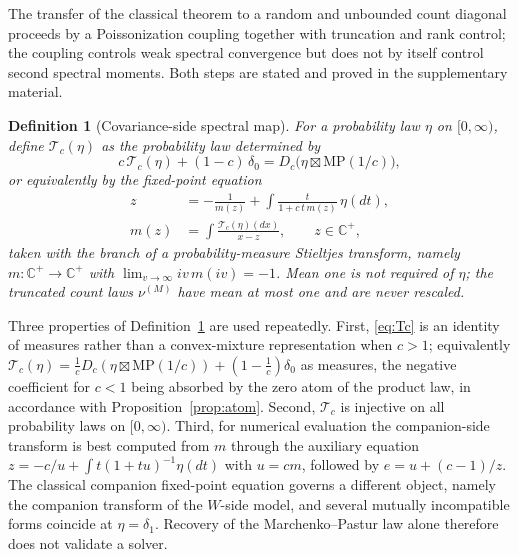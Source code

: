 \documentclass[lettersize,journal]{IEEEtran}
\newtheorem{defi}[theo]{Definition}
\theoremstyle{remark}
\begin{document}
The transfer of the classical theorem to a random and unbounded count diagonal
proceeds by a Poissonization coupling together with truncation and rank
control; the coupling controls weak spectral convergence but does not by itself
control second spectral moments. Both steps are stated and proved in the
supplementary material.

\begin{defi}[Covariance-side spectral map\cite{silverstein1995analysis}]
\label{def:Tc}
For a probability law $\eta$ on $[0,\infty)$, define $\mathcal{T}_c(\eta)$ as
the probability law determined by
\begin{equation}
  c\,\mathcal{T}_c(\eta)+(1-c)\,\delta_0
    = D_c\big(\eta\boxtimes\mathrm{MP}(1/c)\big),
  \label{eq:Tc}
\end{equation}
or equivalently by the fixed-point equation
\begin{align}
  z&=-\tfrac1{m(z)}+\int\tfrac{t}{1+c\,t\,m(z)}\,\eta(dt),\nonumber\\
  m(z)&=\int\tfrac{\mathcal{T}_c(\eta)(dx)}{x-z},\qquad z\in\mathbb{C}^+,
  \label{eq:fp}
\end{align}
taken with the branch of a probability-measure Stieltjes transform, namely
$m:\mathbb{C}^+\to\mathbb{C}^+$ with $\lim_{v\to\infty}iv\,m(iv)=-1$. Mean one
is not required of $\eta$; the truncated count laws $\nu^{(M)}$ have mean at
most one and are never rescaled.
\end{defi}

Three properties of Definition~\ref{def:Tc} are used repeatedly. First,
\eqref{eq:Tc} is an identity of measures rather than a convex-mixture
representation when $c>1$; equivalently
$\mathcal{T}_c(\eta)=\frac1cD_c(\eta\boxtimes\mathrm{MP}(1/c))
+(1-\frac1c)\delta_0$ as measures, the negative coefficient for $c<1$ being
absorbed by the zero atom of the product law, in accordance with
Proposition~\ref{prop:atom}. Second, $\mathcal{T}_c$ is injective on all
probability laws on $[0,\infty)$. Third, for numerical evaluation the
companion-side transform is best computed from $m$ through the auxiliary
equation $z=-c/u+\int t(1+tu)^{-1}\eta(dt)$ with $u=cm$, followed by
$e=u+(c-1)/z$. The classical companion fixed-point equation governs a
different object, namely the companion transform of the $W$-side model, and
several mutually incompatible forms coincide at $\eta=\delta_1$. Recovery of
the Marchenko--Pastur law alone therefore does not validate a solver.
\end{document}
